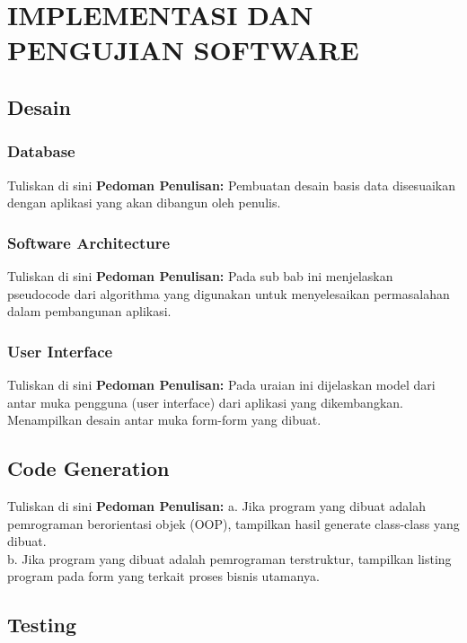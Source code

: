 \chapter{IMPLEMENTASI DAN PENGUJIAN SOFTWARE}
\section{Desain}
\subsection{Database}


Tuliskan di sini \textbf{Pedoman Penulisan:} Pembuatan desain basis data disesuaikan dengan aplikasi yang akan dibangun oleh penulis.


\subsection{Software Architecture}


Tuliskan di sini \textbf{Pedoman Penulisan:} Pada sub bab ini menjelaskan pseudocode dari algorithma yang digunakan untuk menyelesaikan permasalahan dalam pembangunan aplikasi.


\subsection{User Interface}


Tuliskan di sini \textbf{Pedoman Penulisan:} Pada uraian ini dijelaskan model dari antar muka pengguna (user interface) dari aplikasi yang dikembangkan. Menampilkan desain antar muka form-form yang dibuat.



\section{Code Generation}


Tuliskan di sini \textbf{Pedoman Penulisan:} a. Jika program yang dibuat adalah pemrograman berorientasi objek (OOP), tampilkan hasil generate class-class yang dibuat.\\
b. Jika program yang dibuat adalah pemrograman terstruktur, tampilkan listing program pada form yang terkait proses bisnis utamanya.



\section{Testing}


